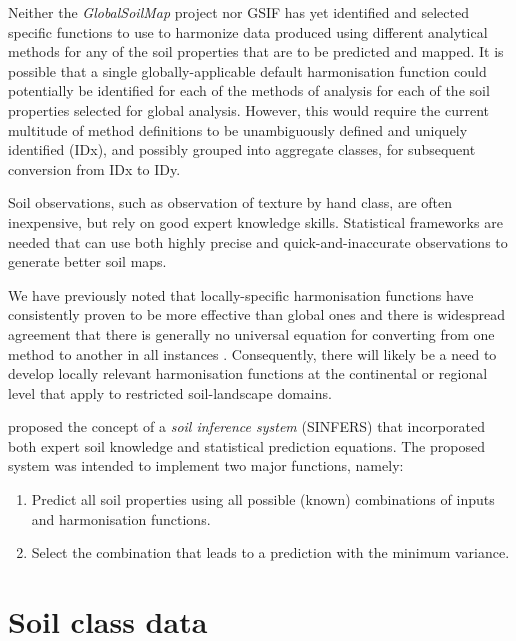 \documentclass[11pt]{krantz}
\makeatletter
\newenvironment{kframe}{%
\medskip{}
\setlength{\fboxsep}{.8em}
 \def\at@end@of@kframe{}%
 \ifinner\ifhmode%
  \def\at@end@of@kframe{\end{minipage}}%
  \begin{minipage}{\columnwidth}%
 \fi\fi%
 \def\FrameCommand##1{\hskip\@totalleftmargin \hskip-\fboxsep
 \colorbox{shadecolor}{##1}\hskip-\fboxsep
     \hskip-\linewidth \hskip-\@totalleftmargin \hskip\columnwidth}%
 \MakeFramed {\advance\hsize-\width
   \@totalleftmargin\z@ \linewidth\hsize
   \@setminipage}}%
 {\par\unskip\endMakeFramed%
 \at@end@of@kframe}
\newenvironment{rmdblock}[1]
  {
  \begin{itemize}
  \renewcommand{\labelitemi}{
    \raisebox{-.7\height}[0pt][0pt]{
      {\setkeys{Gin}{width=3em,keepaspectratio}\texttt{[image: images/\#1]}}
    }
  }
  \setlength{\fboxsep}{1em}
  \begin{kframe}
  \item
  }
  {
  \end{kframe}
  \end{itemize}
  }
\newenvironment{rmdnote}
  {\begin{rmdblock}{note}}
  {\end{rmdblock}}
\theoremstyle{definition}
\theoremstyle{definition}
\theoremstyle{definition}
\theoremstyle{remark}
\makeatother
\begin{document}
Neither the \emph{GlobalSoilMap} project nor GSIF has yet identified and
selected specific functions to use to harmonize data produced using
different analytical methods for any of the soil properties that are to
be predicted and mapped. It is possible that a single
globally-applicable default harmonisation function could potentially be
identified for each of the methods of analysis for each of the soil
properties selected for global analysis. However, this would require the
current multitude of method definitions to be unambiguously defined and
uniquely identified (IDx), and possibly grouped into aggregate classes,
for subsequent conversion from IDx to IDy.

\begin{rmdnote}
Soil observations, such as observation of texture by hand class, are
often inexpensive, but rely on good expert knowledge skills. Statistical
frameworks are needed that can use both highly precise and
quick-and-inaccurate observations to generate better soil maps.
\end{rmdnote}

We have previously noted that locally-specific harmonisation functions
have consistently proven to be more effective than global ones and there
is widespread agreement that there is generally no universal equation
for converting from one method to another in all instances
\citep{Konen2002SSSAJ, Meersmans2009SUM, Jankauskas2006CSSPA, Jolivet1998CSSPA, DeVos2007SUM}.
Consequently, there will likely be a need to develop locally relevant
harmonisation functions at the continental or regional level that apply
to restricted soil-landscape domains.

\citet{McBratney2002Geoderma} proposed the concept of a \emph{soil
inference system} (SINFERS) that incorporated both expert soil knowledge
and statistical prediction equations. The proposed system was intended
to implement two major functions, namely:

\begin{enumerate}
\def\labelenumi{\arabic{enumi}.}
\item
  Predict all soil properties using all possible (known) combinations of
  inputs and harmonisation functions.
\item
  Select the combination that leads to a prediction with the minimum
  variance.
\end{enumerate}

\hypertarget{soil-class-data}{%
\section{Soil class data}\label{soil-class-data}}
\end{document}
